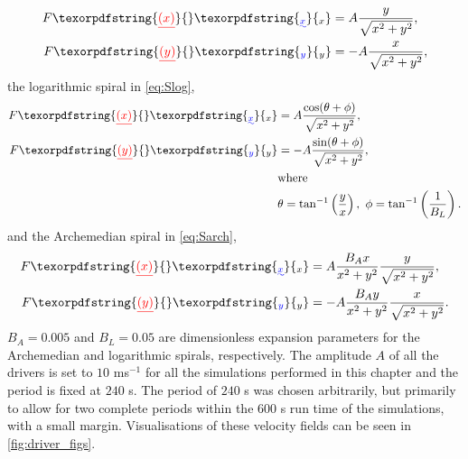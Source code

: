 \documentclass[a4paper,12pt,fourier,authoryear,custommargin]{Classes/PhDThesisPSnPDF}
\providecommand{\DIFaddtex}[1]{{\protect\color{blue}\uwave{#1}}} %
\providecommand{\DIFdeltex}[1]{{\protect\color{red}\sout{#1}}}                      %
\providecommand{\DIFaddbegin}{} %
\providecommand{\DIFaddend}{} %
\providecommand{\DIFdelbegin}{} %
\providecommand{\DIFdelend}{} %
\providecommand{\DIFadd}[1]{\texorpdfstring{\DIFaddtex{#1}}{#1}} %
\providecommand{\DIFdel}[1]{\texorpdfstring{\DIFdeltex{#1}}{}} %
\begin{document}
\begin{subequations}
    \begin{align}
        F\DIFdelbegin \DIFdel{(x) }\DIFdelend \DIFaddbegin \DIFadd{_x }\DIFaddend &= A \frac{y}{\sqrt{x^2 + y^2}},\\
        F\DIFdelbegin \DIFdel{(y) }\DIFdelend \DIFaddbegin \DIFadd{_y }\DIFaddend &= - A \frac{x}{\sqrt{x^2 + y^2}},
    \end{align}
    \label{eq:Suni}
\end{subequations}
the logarithmic spiral in \cref{eq:Slog},
\begin{subequations}
    \begin{align}
        F\DIFdelbegin \DIFdel{(x) }\DIFdelend \DIFaddbegin \DIFadd{_x }\DIFaddend &= A \frac{\cos(\theta + \phi)}{\sqrt{x^2 + y^2}},\\
        F\DIFdelbegin \DIFdel{(y) }\DIFdelend \DIFaddbegin \DIFadd{_y }\DIFaddend &= - A \frac{\sin(\theta + \phi)}{\sqrt{x^2 + y^2}},\\
            &\text{where}\notag\\
            &\theta = \tan^{-1}\left(\frac{y}{x}\right),\ \phi = \tan^{-1}\left(\frac{1}{B_L}\right).\notag
    \end{align}
    \label{eq:Slog}
\end{subequations}
and the Archemedian spiral in \cref{eq:Sarch},
\begin{subequations}
    \begin{align}
        F\DIFdelbegin \DIFdel{(x) }\DIFdelend \DIFaddbegin \DIFadd{_x }\DIFaddend &= A \frac{B_Ax}{x^2 + y^2} \frac{y}{\sqrt{x^2 + y^2}},\\
        F\DIFdelbegin \DIFdel{(y) }\DIFdelend \DIFaddbegin \DIFadd{_y }\DIFaddend &= - A \frac{B_Ay}{x^2 + y^2} \frac{x}{\sqrt{x^2 + y^2}}.
    \end{align}
    \label{eq:Sarch}
\end{subequations}
$B_A = 0.005$ and $B_L = 0.05$ are dimensionless expansion parameters for the Archemedian  and logarithmic spirals, respectively.
The amplitude $A$ of all the drivers is set to $10$ ms$^{-1}$ for all the simulations performed in this chapter and the period is fixed at $240$ s.
The period of $240$ s was chosen arbitrarily, but primarily to allow for two complete periods within the $600$ s run time of the simulations, with a small margin.
Visualisations of these velocity fields can be seen in \cref{fig:driver_figs}.
\end{document}
